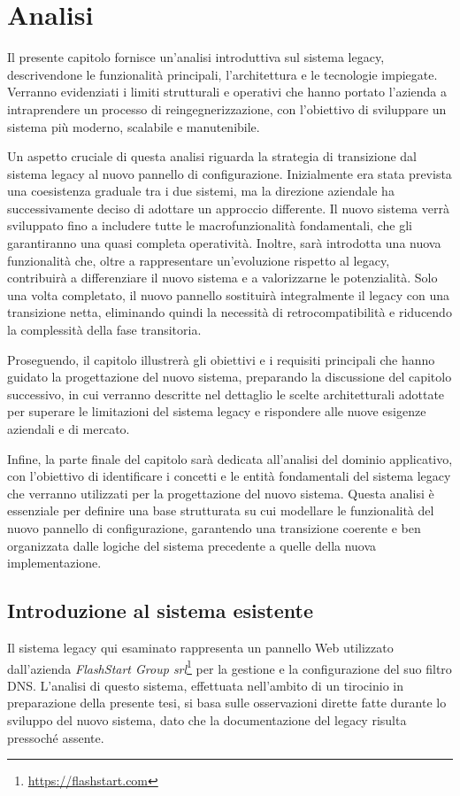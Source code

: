 \chapter{Analisi}
Il presente capitolo fornisce un'analisi introduttiva sul sistema legacy, descrivendone le funzionalità principali, l'architettura e le tecnologie impiegate. Verranno evidenziati i limiti strutturali e operativi che hanno portato l'azienda a intraprendere un processo di reingegnerizzazione, con l'obiettivo di sviluppare un sistema più moderno, scalabile e manutenibile.

Un aspetto cruciale di questa analisi riguarda la strategia di transizione dal sistema legacy al nuovo pannello di configurazione. Inizialmente era stata prevista una coesistenza graduale tra i due sistemi, ma la direzione aziendale ha successivamente deciso di adottare un approccio differente. Il nuovo sistema verrà sviluppato fino a includere tutte le macrofunzionalità fondamentali, che gli garantiranno una quasi completa operatività. Inoltre, sarà introdotta una nuova funzionalità che, oltre a rappresentare un'evoluzione rispetto al legacy, contribuirà a differenziare il nuovo sistema e a valorizzarne le potenzialità.
%
Solo una volta completato, il nuovo pannello sostituirà integralmente il legacy con una transizione netta, eliminando quindi la necessità di retrocompatibilità e riducendo la complessità della fase transitoria.

Proseguendo, il capitolo illustrerà gli obiettivi e i requisiti principali che hanno guidato la progettazione del nuovo sistema, preparando la discussione del capitolo successivo, in cui verranno descritte nel dettaglio le scelte architetturali adottate per superare le limitazioni del sistema legacy e rispondere alle nuove esigenze aziendali e di mercato.

Infine, la parte finale del capitolo sarà dedicata all'analisi del dominio applicativo, con l'obiettivo di identificare i concetti e le entità fondamentali del sistema legacy che verranno utilizzati per la progettazione del nuovo sistema. Questa analisi è essenziale per definire una base strutturata su cui modellare le funzionalità del nuovo pannello di configurazione, garantendo una transizione coerente e ben organizzata dalle logiche del sistema precedente a quelle della nuova implementazione.

\section{Introduzione al sistema esistente}
Il sistema legacy qui esaminato rappresenta un pannello Web utilizzato dall'azienda \textit{FlashStart Group srl}\footnote{\url{https://flashstart.com}} per la gestione e la configurazione del suo filtro DNS. L’analisi di questo sistema, effettuata nell’ambito di un tirocinio in preparazione della presente tesi, si basa sulle osservazioni dirette fatte durante lo sviluppo del nuovo sistema, dato che la documentazione del legacy risulta pressoché assente.


